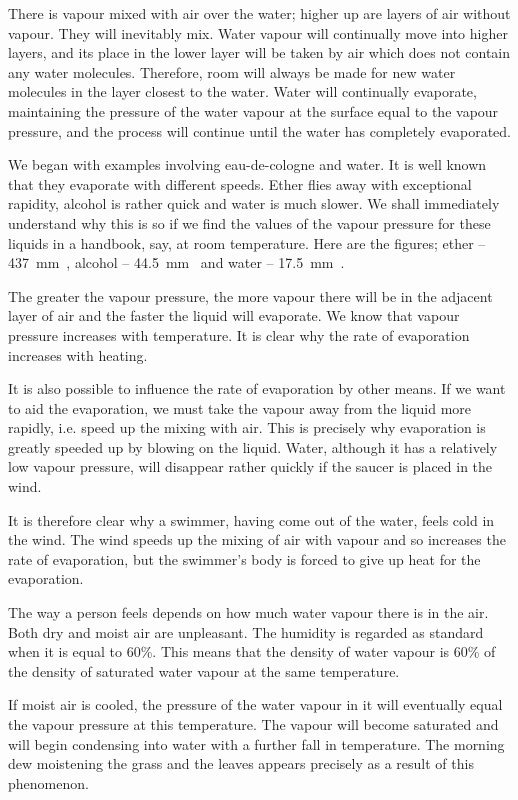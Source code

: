 There is vapour mixed with air over the water; higher up are layers of air without vapour. They will inevitably mix. Water vapour will continually move into higher layers, and its place in the lower layer will be taken by air which does not contain any water molecules. There­fore, room will always be made for new water molecules in the layer closest to the water. Water will continually evaporate, maintaining the pressure of the water vapour at the surface equal to the vapour pressure, and the pro­cess will continue until the water has completely evapo­rated.

We began with examples involving eau-de-cologne and water. It is well known that they evaporate with different speeds. Ether flies away with exceptional rapidity, alcohol is rather quick and water is much slower. We shall immediately understand why this is so if we find the values of the vapour pressure for these liquids in a handbook, say, at room temperature. Here are the figures; ether -- \SI{437}{\milli\meter\mercury}, alcohol -- \SI{44.5}{\milli\meter\mercury} and water -- \SI{17.5}{\milli\meter\mercury}.

The greater the vapour pressure, the more vapour there will be in the adjacent layer of air and the faster the liquid will evaporate. We know that vapour pressure increases with temperature. It is clear why the rate of evap­oration increases with heating.

It is also possible to influence the rate of evaporation by other means. If we want to aid the evaporation, we must take the vapour away from the liquid more rapidly, i.e. speed up the mixing with air. This is precisely why evaporation is greatly speeded up by blowing on the liq­uid. Water, although it has a relatively low vapour pres­sure, will disappear rather quickly if the saucer is placed in the wind.

It is therefore clear why a swimmer, having come out of the water, feels cold in the wind. The wind speeds up the mixing of air with vapour and so increases the rate of evaporation, but the swimmer’s body is forced to give up heat for the evaporation.

The way a person feels depends on how much water vapour there is in the air. Both dry and moist air are unpleasant. The humidity is regarded as standard when it is equal to 60\%. This means that the density of water vapour is 60\% of the density of saturated water vapour at the same temperature.

If moist air is cooled, the pressure of the water vapour in it will eventually equal the vapour pressure at this temperature. The vapour will become saturated and will begin condensing into water with a further fall in tem­perature. The morning dew moistening the grass and the leaves appears precisely as a result of this phenome­non.

